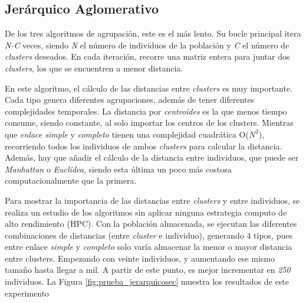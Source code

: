 

\subsection{Jerárquico Aglomerativo}

De los tres algoritmos de agrupación, este es el más lento. Su bucle principal itera \textit{N-C} veces, siendo \textit{N} el número de individuos de la población y \textit{C} el número de \textit{clusters} deseados. En cada iteración, recorre una matriz entera para juntar dos \textit{clusters}, los que se encuentren a menor distancia. 


En este algoritmo, el cálculo de las distancias entre \textit{clusters} es muy importante. Cada tipo genera diferentes agrupaciones, además de tener diferentes complejidades temporales. La distancia por \textit{centroides} es la que menos tiempo consume, siendo constante, al solo importar los centros de los clusters. Mientras que \textit{enlace simple} y \textit{completo} tienen una complejidad cuadrática O(\(N^{2}\)), recorriendo todos los individuos de ambos \textit{clusters} para calcular la distancia. Además, hay que añadir el cálculo de la distancia entre individuos, que puede ser \textit{Manhattan} o \textit{Euclídea}, siendo esta última un poco más costosa computacionalmente que la primera.


Para mostrar la importancia de las distancias entre \textit{clusters} y entre individuos, se realiza un estudio de los algoritmos sin aplicar ninguna estrategia computo de alto rendimiento (HPC). Con la población almacenada, se ejecutan las diferentes combinaciones de distancias (entre \textit{cluster} e individuo), generando 4 tipos, pues entre enlace \textit{simple} y \textit{completo} solo varía almacenar la menor o mayor distancia entre clusters. Empezando con veinte individuos, y aumentando ese mismo tamaño hasta llegar a mil. A partir de este punto, es mejor incrementar en \textit{250} individuos. La Figura \ref{fig:prueba_jerarquicosec} muestra los resultados de este experimento 

